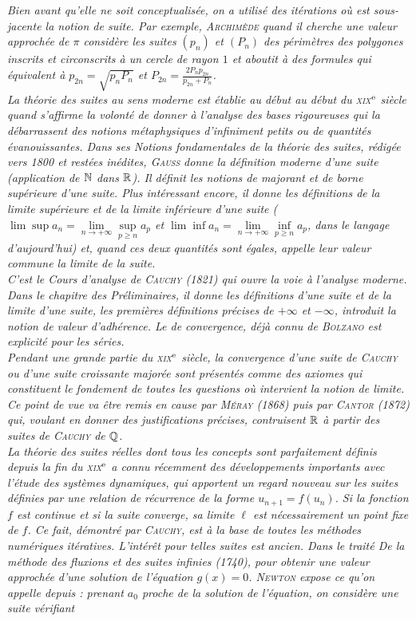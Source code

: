 \textsl{
Bien avant qu'elle ne soit conceptualisée, on a utilisé des itérations où est sous-jacente la notion de suite. Par exemple, \textsc{Archimède} quand il cherche une valeur approchée de $\pi$ considère les suites $(p_n)$ et $(P_n)$ des périmètres des polygones inscrits et circonscrits à un cercle de rayon $1$ et aboutit à des formules qui équivalent à $p_{2n} = \sqrt{p_n P_n}$ et $P_{2n} = \frac{2 P_n p_{2n}}{p_{2n} + P_n}$. \\
La théorie des suites au sens moderne est établie au début au début du \textsc{xix}$^{\mathrm{e}}$ siècle quand s'affirme la volonté de donner à l'analyse des bases rigoureuses qui la débarrassent des notions métaphysiques d'infiniment petits ou de quantités évanouissantes. Dans ses \emph{Notions fondamentales de la théorie des suites}, rédigée vers 1800 et restées inédites, \textsc{Gauss} donne la définition moderne d'une suite (application de $\mathbb{N}$ dans $\mathbb{R}$). Il définit les notions de majorant et de borne supérieure d'une suite. Plus intéressant encore, il donne les définitions de la limite supérieure et de la limite inférieure d'une suite ($\lim \sup a_n = \lim\limits_{n \to + \infty} \sup\limits_{p \geqslant n} a_p$ et $\lim \inf a_n = \lim\limits_{n \to + \infty} \inf\limits_{p \geqslant n} a_p$, dans le langage d'aujourd'hui) et, quand ces deux quantités sont égales, appelle leur valeur commune la limite de la suite. \\
C'est le \emph{Cours d'analyse} de \textsc{Cauchy} (1821) qui ouvre la voie à l'analyse moderne. Dans le chapitre des \emph{Préliminaires}, il donne les définitions d'une suite et de la limite d'une suite, les premières définitions précises de $+\infty$ et $-\infty$, introduit la notion de valeur d'adhérence. Le  de convergence, déjà connu de \textsc{Bolzano} est explicité pour les séries. \\
Pendant une grande partie du \textsc{xix}$^{\mathrm{e}}$ siècle, la convergence d'une suite de \textsc{Cauchy} ou d'une suite croissante majorée sont présentés comme des axiomes qui constituent le fondement de toutes les questions où intervient la notion de limite. Ce point de vue va être remis en cause par \textsc{Méray} (1868) puis par \textsc{Cantor} (1872) qui, voulant en donner des justifications précises, contruisent $\mathbb{R}$ à partir des suites de \textsc{Cauchy} de $\mathbb{Q}$. \\
La théorie des suites réelles dont tous les concepts sont parfaitement définis depuis la fin du \textsc{xix}$^{\mathrm{e}}$ a connu récemment des développements importants avec l'étude des systèmes dynamiques, qui apportent un regard nouveau sur les suites définies par une relation de récurrence de la forme $u_{n+1} = f(u_n)$. Si la fonction $f$ est continue et si la suite converge, sa limite $\ell$ est nécessairement un point fixe de $f$. Ce fait, démontré par \textsc{Cauchy}, est à la base de toutes les méthodes numériques itératives. L'intérêt pour telles suites est ancien. Dans le traité \emph{De la méthode des fluxions et des suites infinies} (1740), pour obtenir une valeur approchée d'une solution de l'équation $g(x) = 0$. \textsc{Newton} expose ce qu'on appelle depuis : prenant $a_0$ proche de la solution de l'équation, on considère une suite vérifiant 
}
